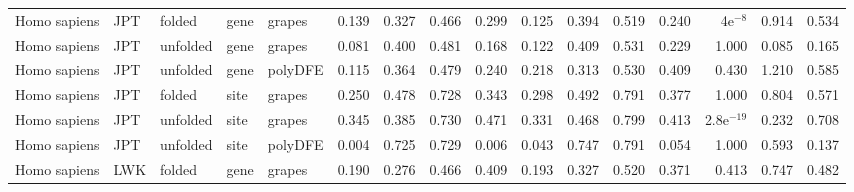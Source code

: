 \begin{longtable}{lllllrrrrrrrrrrr}
        Homo sapiens &                       JPT &    folded &  gene &   grapes &                              0.139 &                               0.327 &                 0.466 &                 0.299 &                              0.125 &                               0.394 &                 0.519 &                 0.240 &     4e$^{-8}$ &  0.914 &  0.534 \\
        Homo sapiens &                       JPT &  unfolded &  gene &   grapes &                              0.081 &                               0.400 &                 0.481 &                 0.168 &                              0.122 &                               0.409 &                 0.531 &                 0.229 &         1.000 &  0.085 &  0.165 \\
        Homo sapiens &                       JPT &  unfolded &  gene &  polyDFE &                              0.115 &                               0.364 &                 0.479 &                 0.240 &                              0.218 &                               0.313 &                 0.530 &                 0.409 &         0.430 &  1.210 &  0.585 \\
        Homo sapiens &                       JPT &    folded &  site &   grapes &                              0.250 &                               0.478 &                 0.728 &                 0.343 &                              0.298 &                               0.492 &                 0.791 &                 0.377 &         1.000 &  0.804 &  0.571 \\
        Homo sapiens &                       JPT &  unfolded &  site &   grapes &                              0.345 &                               0.385 &                 0.730 &                 0.471 &                              0.331 &                               0.468 &                 0.799 &                 0.413 &  2.8e$^{-19}$ &  0.232 &  0.708 \\
        Homo sapiens &                       JPT &  unfolded &  site &  polyDFE &                              0.004 &                               0.725 &                 0.729 &                 0.006 &                              0.043 &                               0.747 &                 0.791 &                 0.054 &         1.000 &  0.593 &  0.137 \\
        Homo sapiens &                       LWK &    folded &  gene &   grapes &                              0.190 &                               0.276 &                 0.466 &                 0.409 &                              0.193 &                               0.327 &                 0.520 &                 0.371 &         0.413 &  0.747 &  0.482 \\

\end{longtable}
